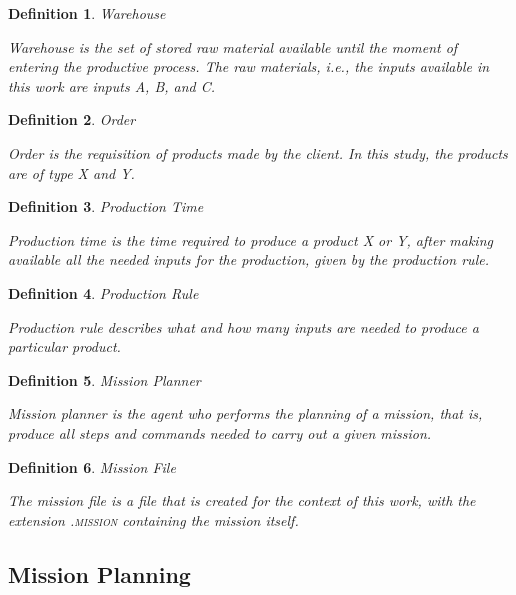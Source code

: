 \documentclass[conference,harvard,brazil,english]{sbatex}
\newtheorem{myDefinition}{Definition}
\begin{document}
\begin{myDefinition}{Warehouse}

Warehouse is the set of stored raw material available until the moment of entering the productive process. The raw materials, i.e., the inputs available in this work are inputs A, B, and C.
\label{almoxarifado}
\end{myDefinition}

\begin{myDefinition}{Order}

Order is the requisition of products made by the client. In this study, the products are of type X and Y.
\label{pedido}
\end{myDefinition}

\begin{myDefinition}{Production Time}

Production time is the time required to produce a product X or Y, after making available all the needed inputs for the production, given by the production rule.
\label{tempoProducao}
\end{myDefinition}

\begin{myDefinition}{Production Rule}

Production rule describes what and how many inputs are needed to produce a particular product.
\label{regraProducao}
\end{myDefinition}

\begin{myDefinition}{Mission Planner}

Mission planner is the agent who performs the planning of a mission, that is, produce all steps and commands needed to carry out a given mission.
\label{planejadorMissao}
\end{myDefinition}

\begin{myDefinition}{Mission File}

The mission file is a file that is created for the context of this work, with the extension \textsc{.mission} containing the mission itself.
\label{arquivoMissao}
\end{myDefinition}


\subsection{Mission Planning}
\label{subsec:missionplanning}
\end{document}
